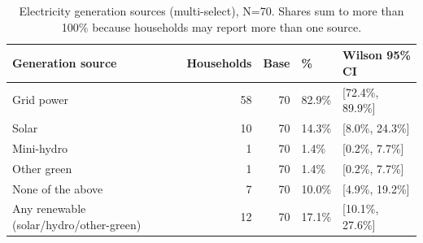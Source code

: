 \begin{table}
\caption{Electricity generation sources (multi-select), N=70. Shares sum to more than 100\% because households may report more than one source.}
\label{tab:generation_sources}
\begin{tabular}{lrrll}
\toprule
Generation source & Households & Base & \% & Wilson 95\% CI \\
\midrule
Grid power & 58 & 70 & 82.9\% & [72.4\%, 89.9\%] \\
Solar & 10 & 70 & 14.3\% & [8.0\%, 24.3\%] \\
Mini-hydro & 1 & 70 & 1.4\% & [0.2\%, 7.7\%] \\
Other green & 1 & 70 & 1.4\% & [0.2\%, 7.7\%] \\
None of the above & 7 & 70 & 10.0\% & [4.9\%, 19.2\%] \\
Any renewable (solar/hydro/other-green) & 12 & 70 & 17.1\% & [10.1\%, 27.6\%] \\
\bottomrule
\end{tabular}
\end{table}
